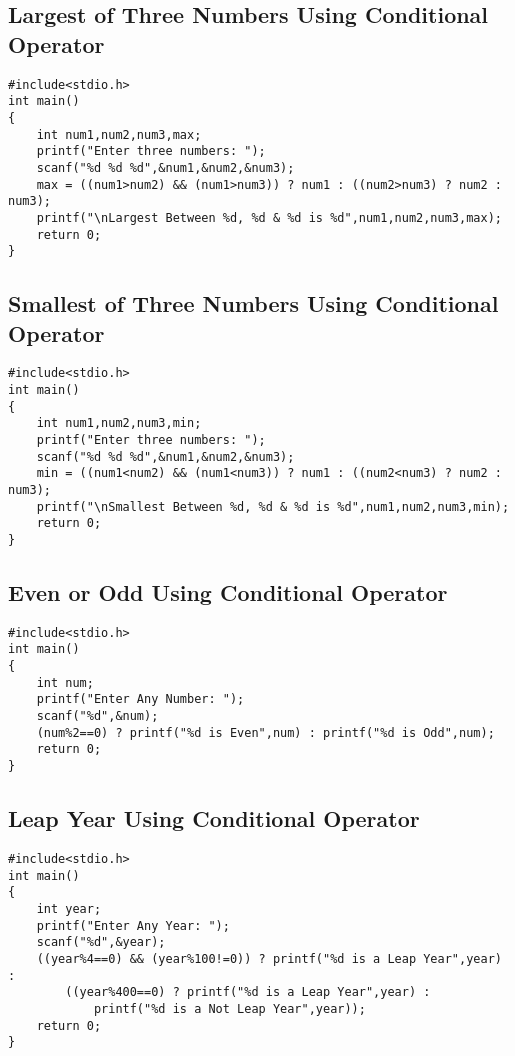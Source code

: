 \documentclass[a4paper,14pt]{article}
\begin{document}
\subsection{Largest of Three Numbers Using Conditional Operator}
\vspace{0.5cm}
\begin{lstlisting}[caption={Largest of Three Numbers Using Conditional Operator}]
#include<stdio.h>
int main()
{
    int num1,num2,num3,max;
    printf("Enter three numbers: ");
    scanf("%d %d %d",&num1,&num2,&num3);
    max = ((num1>num2) && (num1>num3)) ? num1 : ((num2>num3) ? num2 : num3);
    printf("\nLargest Between %d, %d & %d is %d",num1,num2,num3,max);
    return 0;
}
\end{lstlisting}
\newpage

\subsection{Smallest of Three Numbers Using Conditional Operator}
\vspace{0.5cm}
\begin{lstlisting}[caption={Smallest of Three Numbers Using Conditional Operator}]
#include<stdio.h>
int main()
{
    int num1,num2,num3,min;
    printf("Enter three numbers: ");
    scanf("%d %d %d",&num1,&num2,&num3);
    min = ((num1<num2) && (num1<num3)) ? num1 : ((num2<num3) ? num2 : num3);
    printf("\nSmallest Between %d, %d & %d is %d",num1,num2,num3,min);
    return 0;
}
\end{lstlisting}
\newpage

\subsection{Even or Odd Using Conditional Operator}
\vspace{0.5cm}
\begin{lstlisting}[caption={Even or Odd Using Conditional Operator}]
#include<stdio.h>
int main()
{
    int num;
    printf("Enter Any Number: ");
    scanf("%d",&num);
    (num%2==0) ? printf("%d is Even",num) : printf("%d is Odd",num);
    return 0;
}
\end{lstlisting}
\newpage

\subsection{Leap Year Using Conditional Operator}
\vspace{0.5cm}
\begin{lstlisting}[caption={Leap Year Using Conditional Operator}]
#include<stdio.h>
int main()
{
    int year;
    printf("Enter Any Year: ");
    scanf("%d",&year);
    ((year%4==0) && (year%100!=0)) ? printf("%d is a Leap Year",year) : 
        ((year%400==0) ? printf("%d is a Leap Year",year) : 
            printf("%d is a Not Leap Year",year));
    return 0;
}
\end{lstlisting}
\newpage
\end{document}
